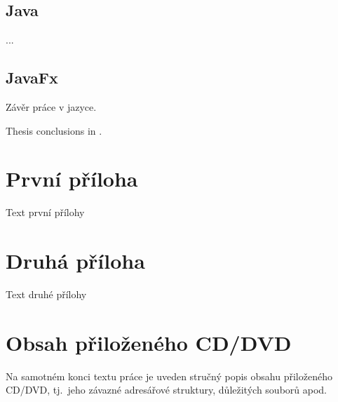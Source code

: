 \documentclass[
  biblatex=false,
  font=serif,
  glossaries=false,
  tables=false,
  theorems=false,
  index
]{kidiplom}
\begin{document}
\subsection{Java}
...

\subsection{JavaFx}

\begin{kiconclusions}
Závěr práce v  jazyce.
\end{kiconclusions}

\begin{kiconclusions}[english]
Thesis conclusions in .
\end{kiconclusions}

\appendix

\section{První příloha}
Text první přílohy

\section{Druhá příloha}
Text druhé přílohy

\section{Obsah přiloženého CD/DVD} \label{sec:ObsahCD}

Na samotném konci textu práce je uveden stručný popis obsahu
přiloženého CD/DVD, tj.~jeho závazné adresářové struktury, důležitých
souborů apod.
\end{document}
